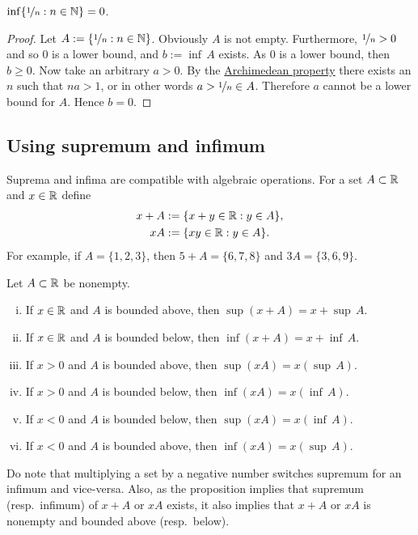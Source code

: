 \begin{cor}
$\inf \{ \nicefrac{1}{n} : n \in {\mathbb{N}} \} = 0$.
\end{cor}

\begin{proof}
Let $A := \{ \nicefrac{1}{n} : n \in {\mathbb{N}} \}$.  Obviously $A$ is not empty.
Furthermore,
$\nicefrac{1}{n} > 0$ and so 0 is a lower bound, and $b := \inf\, A$ exists.
As 0 is a lower bound, then $b \geq 0$.
Now take an arbitrary $a > 0$.  By the
\hyperref[thm:arch:i]{Archimedean property} there exists an $n$ such that
$na > 1$, or in other words $a > \nicefrac{1}{n} \in A$.  Therefore
$a$ cannot be a lower bound for $A$.  Hence $b=0$.
\end{proof}

\subsection{Using supremum and infimum}

Suprema and infima are
compatible with algebraic operations.  For a set $A \subset {\mathbb{R}}$ and 
$x \in {\mathbb{R}}$ define
\begin{align*}
x + A & := \{ x+y \in {\mathbb{R}} : y \in A \} , \\
xA & := \{ xy \in {\mathbb{R}} : y \in A \} .
\end{align*}
For example, if $A = \{ 1,2,3 \}$, then $5+A = \{ 6,7,8 \}$ and $3A = \{ 3,6,9
\}$.

\begin{prop} \label{prop:supinfalg}
Let $A \subset {\mathbb{R}}$ be nonempty.
\begin{enumerate}[(i)]
\item If $x \in {\mathbb{R}}$ and $A$ is bounded above, then $\sup (x+A) = x + \sup\, A$.
\item If $x \in {\mathbb{R}}$ and $A$ is bounded below, then $\inf (x+A) = x + \inf\, A$.
\item If $x > 0$ and $A$ is bounded above, then $\sup (xA) = x ( \sup\, A )$.
\item If $x > 0$ and $A$ is bounded below, then $\inf (xA) = x ( \inf\, A )$.
\item If $x < 0$ and $A$ is bounded below, then $\sup (xA) = x ( \inf\, A )$.
\item If $x < 0$ and $A$ is bounded above, then $\inf (xA) = x ( \sup\, A )$.
\end{enumerate}
\end{prop}

Do note that multiplying a set by a negative number switches supremum for an
infimum and vice-versa.  Also, as the proposition implies that
supremum (resp.\ infimum) of $x+A$ or $xA$ exists, 
it also implies that $x+A$ or $xA$
is nonempty and bounded above (resp.\ below).

